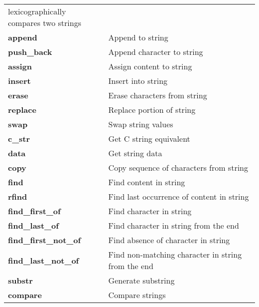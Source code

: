 \documentclass[main]{subfiles}
\begin{document}
\begin{longtable}{p{0.4\linewidth} p{0.6\linewidth}}
lexicographically compares two strings \\

\textbf{append} &
Append to string\\

\textbf{push\_back} &
Append character to string\\

\textbf{assign} &
Assign content to string\\

\textbf{insert} &
Insert into string\\

\textbf{erase} &
Erase characters from string\\

\textbf{replace} &
Replace portion of string\\

\textbf{swap} &
Swap string values\\

\textbf{c\_str} &
Get C string equivalent\\

\textbf{data} &
Get string data\\

\textbf{copy} &
Copy sequence of characters from string\\

\textbf{find} &
Find content in string\\

\textbf{rfind} &
Find last occurrence of content in string\\

\textbf{find\_first\_of} &
Find character in string\\

\textbf{find\_last\_of} &
Find character in string from the end\\

\textbf{find\_first\_not\_of} &
Find absence of character in string\\

\textbf{find\_last\_not\_of} &
Find non-matching character in string from the end\\

\textbf{substr} &
Generate substring\\

\textbf{compare} &
Compare strings\\
\end{longtable}
\todo[inline]{}
\end{document}
